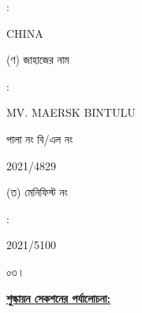 \documentclass[12pt]{article}
\newcommand{\coship}{CHINA}
\newcommand{\vessel}{MV. MAERSK BINTULU}
\newcommand{\rotno}{2021/4829}
\newcommand{\menifest}{2021/5100}
\begin{document}
\begin{minipage}[t]{0.02\linewidth}
:
\end{minipage}
\begin{minipage}[t]{0.50\linewidth}
{\coship}
\\
\end{minipage}
\begin{minipage}[t]{0.05\linewidth}
\hspace*{1em}
\end{minipage}
\begin{minipage}[t]{0.45\linewidth}
(ণ) জাহাজের নাম
\end{minipage}
\begin{minipage}[t]{0.02\linewidth}
:
\end{minipage}
\begin{minipage}[t]{0.50\linewidth}
{\vessel}
\end{minipage}
\begin{minipage}[t]{0.05\linewidth}
\hspace*{1em}
\end{minipage}
\begin{minipage}[t]{0.45\linewidth}
\hspace*{1.8em}পালা নং বি/এল নং
\end{minipage}
\begin{minipage}[t]{0.02\linewidth}
\hspace{1em}
\end{minipage}
\begin{minipage}[t]{0.50\linewidth}
{\rotno}
\\
\end{minipage}
\begin{minipage}[t]{0.05\linewidth}
\hspace*{1em}
\end{minipage}
\begin{minipage}[t]{0.45\linewidth}
(ত) মেনিফিস্ট নং
\end{minipage}
\begin{minipage}[t]{0.02\linewidth}
:
\end{minipage}
\begin{minipage}[t]{0.50\linewidth}
{\menifest}
\\
\end{minipage}
\normalsize
\begin{minipage}[t]{0.05\linewidth}
০৩।
\end{minipage}
\begin{minipage}[t]{0.95\linewidth}
\underline{\textbf{শুল্কায়ন সেকশনের পর্যালোচনা:}}
\end{minipage}
\end{document}
